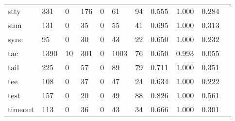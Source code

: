 \begin{longtable}{lp{1.10cm}p{1.10cm}p{1.10cm}p{1.10cm}p{1.10cm}p{1.10cm}p{1.10cm}p{1.10cm}p{1.10cm}p{1.10cm}}
stty      &                    331 &                                  0 &                               176 &                                0 &                                61 &                              94 &                          0.555 &                                 1.000 &                               0.284 \\
sum       &                    131 &                                  0 &                                35 &                                0 &                                55 &                              41 &                          0.695 &                                 1.000 &                               0.313 \\
sync      &                     95 &                                  0 &                                30 &                                0 &                                43 &                              22 &                          0.650 &                                 1.000 &                               0.232 \\
tac       &                   1390 &                                 10 &                               301 &                                0 &                              1003 &                              76 &                          0.650 &                                 0.993 &                               0.055 \\
tail      &                    225 &                                  0 &                                57 &                                0 &                                89 &                              79 &                          0.711 &                                 1.000 &                               0.351 \\
tee       &                    108 &                                  0 &                                37 &                                0 &                                47 &                              24 &                          0.634 &                                 1.000 &                               0.222 \\
test      &                    157 &                                  0 &                                20 &                                0 &                                49 &                              88 &                          0.826 &                                 1.000 &                               0.561 \\
timeout   &                    113 &                                  0 &                                36 &                                0 &                                43 &                              34 &                          0.666 &                                 1.000 &                               0.301 \\

\end{longtable}
